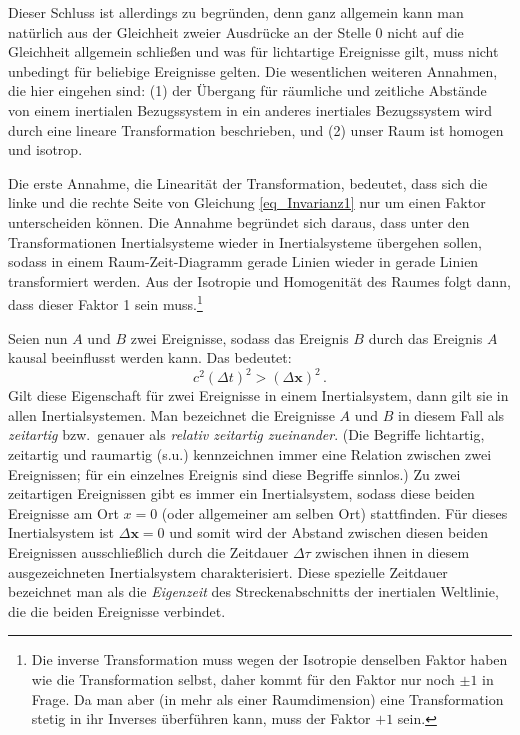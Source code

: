 Dieser Schluss ist allerdings zu begr\"unden, denn ganz allgemein
kann man nat\"urlich aus der Gleichheit zweier Ausdr\"ucke an der Stelle 0 nicht auf die Gleichheit
allgemein schlie\ss en und was f\"ur lichtartige Ereignisse gilt, muss
nicht unbedingt f\"ur beliebige Ereignisse gelten. Die wesentlichen weiteren Annahmen, die hier
eingehen sind: (1) der \"Ubergang f\"ur r\"aumliche und zeitliche Abst\"ande von einem inertialen
Bezugssystem in ein anderes inertiales Bezugssystem wird durch eine lineare Transformation
beschrieben, und (2) unser Raum ist homogen und 
isotrop. 

Die erste Annahme, die Linearit\"at der Transformation, bedeutet, dass sich die linke und die rechte
Seite von Gleichung \ref{eq_Invarianz1} nur um einen Faktor unterscheiden k\"onnen. Die Annahme
begr\"undet sich daraus, dass unter den Transformationen Inertialsysteme wieder in Inertialsysteme
\"ubergehen sollen, sodass in einem Raum-Zeit-Diagramm gerade Linien wieder in gerade
Linien transformiert werden. Aus der Isotropie und Homogenit\"at des Raumes folgt dann, dass dieser
Faktor 1 sein muss.\footnote{Die inverse Transformation muss wegen der Isotropie denselben
Faktor haben wie die Transformation selbst, daher kommt f\"ur den Faktor nur noch $\pm 1$ in Frage.
Da man aber (in mehr als einer Raumdimension) eine Transformation stetig in ihr Inverses
\"uberf\"uhren kann, muss der Faktor $+1$ sein.} 

Seien nun $A$ und $B$ zwei Ereignisse, sodass
das Ereignis $B$ durch das Ereignis $A$ kausal beeinflusst werden kann. Das bedeutet:
\begin{equation} 
\label{eq_kausal}
              c^2 (\Delta t)^2 > (\Delta \pmb{x})^2     \, .
\end{equation}
Gilt diese Eigenschaft f\"ur zwei Ereignisse in einem Inertialsystem, dann gilt sie in allen
Inertialsystemen. Man bezeichnet die Ereignisse $A$ und $B$ in diesem Fall als 
\textit{zeitartig} bzw.\ genauer als \textit{relativ zeitartig zueinander}.
(Die Begriffe lichtartig, zeitartig und raumartig (s.u.) kennzeichnen immer eine Relation
zwischen zwei Ereignissen; f\"ur ein einzelnes Ereignis sind diese Begriffe sinnlos.)
Zu zwei zeitartigen Ereignissen gibt es immer ein Inertialsystem, sodass diese beiden 
Ereignisse am Ort $x=0$ (oder allgemeiner am selben Ort) stattfinden. F\"ur dieses Inertialsystem
ist $\Delta \pmb{x} =0$ und somit wird der Abstand zwischen diesen beiden Ereignissen 
ausschlie\ss lich durch die Zeitdauer $\Delta \tau$ zwischen ihnen in diesem ausgezeichneten
Inertialsystem charakterisiert. Diese spezielle Zeitdauer bezeichnet man als die 
\textit{Eigenzeit}
des Streckenabschnitts der inertialen Weltlinie, die die beiden Ereignisse verbindet.

